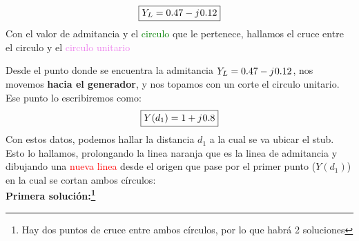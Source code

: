 \documentclass[
	12pt, %
	fleqn, %
	a4paper, %
	oneside, %
]{LegrandOrangeBook}
\begin{document}
\begin{example}
\begin{equation*}
\boxed{Y_L=0.47-{j\mkern1mu} 0.12}
\end{equation*}
Con el valor de admitancia y el \textcolor{green}{circulo} que le pertenece, hallamos el cruce entre el circulo y el \textcolor{violet}{circulo unitario}
\begin{center}
\end{center}
Desde el punto donde se encuentra la admitancia $Y_L=0.47-{j\mkern1mu} 0.12$, nos movemos \textbf{hacia el generador}, y nos topamos con un corte el circulo unitario. Ese punto lo escribiremos como:
\begin{equation*}
\boxed{Y(d_1)=1+{j\mkern1mu}0.8}
\end{equation*}
Con estos datos, podemos hallar la distancia $d_1$ a la cual se va ubicar el stub. Esto lo hallamos, prolongando la linea naranja que es la linea de admitancia y dibujando una \textcolor{red}{nueva linea} desde el origen que pase por el primer punto ($Y(d_1)$) en la cual se cortan ambos círculos:\\
\textbf{Primera solución:\footnote{Hay dos puntos de cruce entre ambos círculos, por lo que habrá 2 soluciones}}\\
\begin{center}

\end{center}
\end{example}
\end{document}
